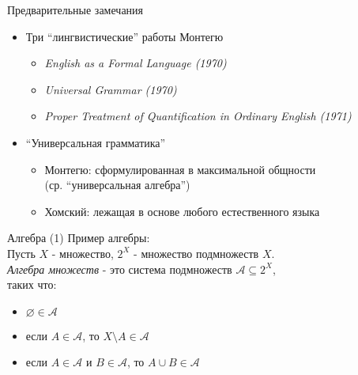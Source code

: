\documentclass{beamer}
\begin{document}




\begin{frame}{Предварительные замечания}
\begin{itemize}
  \item Три ``лингвистические'' работы Монтегю
    \begin{itemize}
      \item \textit{English as a Formal Language (1970)}
	  \item \textit{Universal Grammar (1970)}
  	  \item \textit{Proper Treatment of Quantification in Ordinary English (1971)}
    \end{itemize}
    \bigskip
  \item ``Универсальная грамматика''
    \begin{itemize}
      \item Монтегю: сформулированная в максимальной общности \\(ср. ``универсальная алгебра'')
      \item Хомский: лежащая в основе любого естественного языка
    \end{itemize}
\end{itemize}
\end{frame}

\begin{frame}{Алгебра (1)}
Пример алгебры:\\
\bigskip
Пусть $X$ - множество, $2^X$ - множество подмножеств $X$.\\
\textit{Алгебра множеств} - это система подмножеств $\mathcal{A} \subseteq 2^X$,\\ таких что:\\
\begin{itemize}
  \item $\varnothing \in \mathcal{A}$
  \item если $A \in \mathcal{A}$, то $X \! \setminus \! A \in \mathcal{A}$
  \item если $A \in \mathcal{A}$ и $B \in \mathcal{A}$, то $A \cup B \in \mathcal{A}$
\end{itemize}
\end{frame}
\end{document}
